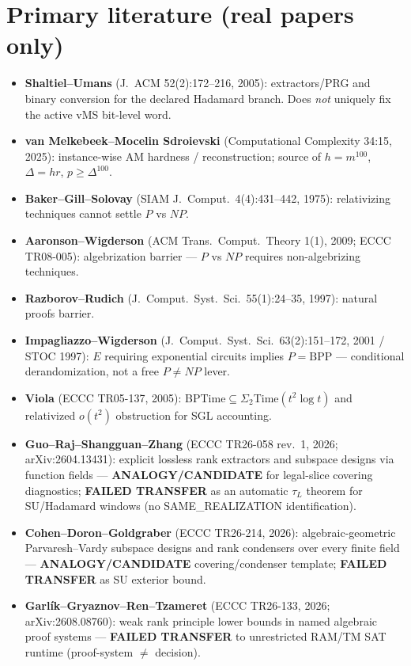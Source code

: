 \documentclass[11pt]{article}
\begin{document}
\section*{Primary literature (real papers only)}
\begin{itemize}
\item \textbf{Shaltiel--Umans} (J.~ACM 52(2):172--216, 2005): extractors/PRG and binary conversion
for the declared Hadamard branch. Does \emph{not} uniquely fix the active vMS bit-level word.
\item \textbf{van Melkebeek--Mocelin Sdroievski} (Computational Complexity 34:15, 2025): instance-wise
AM hardness / reconstruction; source of $h=m^{100}$, $\Delta=hr$, $p\ge\Delta^{100}$.
\item \textbf{Baker--Gill--Solovay} (SIAM J.\ Comput.\ 4(4):431--442, 1975): relativizing techniques
cannot settle $P$ vs $NP$.
\item \textbf{Aaronson--Wigderson} (ACM Trans.\ Comput.\ Theory 1(1), 2009; ECCC TR08-005):
algebrization barrier --- $P$ vs $NP$ requires non-algebrizing techniques.
\item \textbf{Razborov--Rudich} (J.\ Comput.\ Syst.\ Sci.\ 55(1):24--35, 1997): natural proofs barrier.
\item \textbf{Impagliazzo--Wigderson} (J.\ Comput.\ Syst.\ Sci.\ 63(2):151--172, 2001 / STOC 1997):
$E$ requiring exponential circuits implies $P=\mathrm{BPP}$ --- conditional derandomization,
not a free $P\neq NP$ lever.
\item \textbf{Viola} (ECCC TR05-137, 2005): BPTime$\subseteq\Sigma_2$Time$(t^2\log t)$ and relativized
$o(t^2)$ obstruction for SGL accounting.
\item \textbf{Guo--Raj--Shangguan--Zhang} (ECCC TR26-058 rev.~1, 2026; arXiv:2604.13431):
explicit lossless rank extractors and subspace designs via function fields ---
\textbf{ANALOGY/CANDIDATE} for legal-slice covering diagnostics; \textbf{FAILED TRANSFER} as an
automatic $\tau_L$ theorem for SU/Hadamard windows (no SAME\_REALIZATION identification).
\item \textbf{Cohen--Doron--Goldgraber} (ECCC TR26-214, 2026): algebraic-geometric Parvaresh--Vardy
subspace designs and rank condensers over every finite field ---
\textbf{ANALOGY/CANDIDATE} covering/condenser template; \textbf{FAILED TRANSFER} as SU exterior
bound.
\item \textbf{Garl\'ik--Gryaznov--Ren--Tzameret} (ECCC TR26-133, 2026; arXiv:2608.08760):
weak rank principle lower bounds in named algebraic proof systems ---
\textbf{FAILED TRANSFER} to unrestricted RAM/TM SAT runtime (proof-system $\neq$ decision).

\end{itemize}
\end{document}
